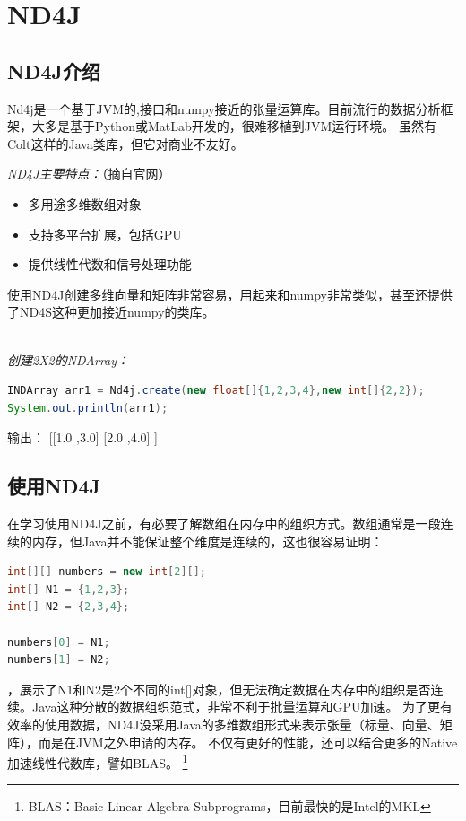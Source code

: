\chapter{ND4J}
\label{chap:java_nd4j}

\section{ND4J介绍}

Nd4j是一个基于JVM的,接口和numpy接近的张量运算库。目前流行的数据分析框架，大多是基于Python或MatLab开发的，很难移植到JVM运行环境。
虽然有Colt这样的Java类库，但它对商业不友好。
\vspace{0.5cm}\noindent

\emph{ND4J主要特点：}（摘自官网）
\begin{itemize}
\item[1.] 多用途多维数组对象
\item[2.] 支持多平台扩展，包括GPU
\item[3.] 提供线性代数和信号处理功能
\end{itemize}

\noindent
使用ND4J创建多维向量和矩阵非常容易，用起来和numpy非常类似，甚至还提供了ND4S这种更加接近numpy的类库。

\noindent \ \\
\emph{创建2X2的NDArray：}
\begin{lstlisting}[language=Java]
INDArray arr1 = Nd4j.create(new float[]{1,2,3,4},new int[]{2,2});
System.out.println(arr1);
\end{lstlisting}
输出：
[[1.0 ,3.0]
[2.0 ,4.0]
]

\section{使用ND4J}
在学习使用ND4J之前，有必要了解数组在内存中的组织方式。数组通常是一段连续的内存，但Java并不能保证整个维度是连续的，这也很容易证明：

\begin{lstlisting}[language=Java,caption={Java二维数组},label=code:part3_array_mem]
int[][] numbers = new int[2][];
int[] N1 = {1,2,3};
int[] N2 = {2,3,4};

numbers[0] = N1;
numbers[1] = N2;
\end{lstlisting}

，展示了N1和N2是2个不同的int[]对象，但无法确定数据在内存中的组织是否连续。Java这种分散的数据组织范式，非常不利于批量运算和GPU加速。
为了更有效率的使用数据，ND4J没采用Java的多维数组形式来表示张量（标量、向量、矩阵），而是在JVM之外申请的内存。
不仅有更好的性能，还可以结合更多的Native加速线性代数库，譬如BLAS。
\footnote{BLAS：Basic Linear Algebra Subprograms，目前最快的是Intel的MKL}


